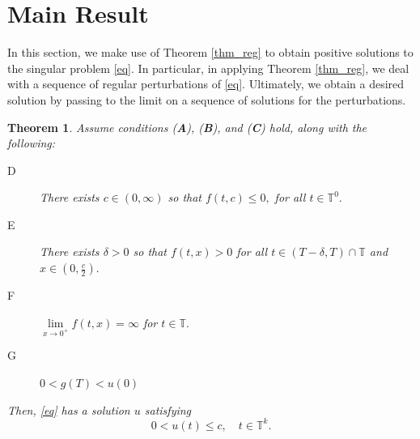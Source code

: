 \documentclass[12pt,reqno]{amsart}
\newtheorem{theorem}{Theorem}[section]
\begin{document}
\section{Main Result}
In this section, we make use of Theorem \ref{thm_reg} to obtain positive solutions to the singular problem \eqref{eq}.  In particular, in applying Theorem \ref{thm_reg}, we deal with a sequence of regular perturbations of \eqref{eq}.  Ultimately, we obtain a desired solution by passing to the limit on a sequence of solutions for the perturbations.

\begin{theorem}\label{main}
	Assume conditions \emph{(\textbf{A})}, \emph{(\textbf{B})}, and \emph{(\textbf{C})} hold, along with the following:
	\begin{description}
		\item[D] There exists $c \in (0,\infty)$ so that $f(t,c) \leq 0,$ for all $t \in \mathbb{T}^0.$
		\item[E] There exists $\delta > 0$ so that $f(t,x) > 0$ for all $t \in (T-\delta,T) \cap \mathbb{T}$ and $x \in \left(0, \frac{c}{2}\right).$
		\item[F] $\lim\limits_{x \rightarrow 0^{+}} f(t,x) = \infty$ for $t \in \mathbb{T}.$ 
        \item[G] $0< g(T) <u(0)$ 
	\end{description}
    Then, \eqref{eq} has a solution $u$ satisfying $$0 < u(t) \leq c, \quad t \in \mathbb{T}^k.$$
\end{theorem}
\end{document}
